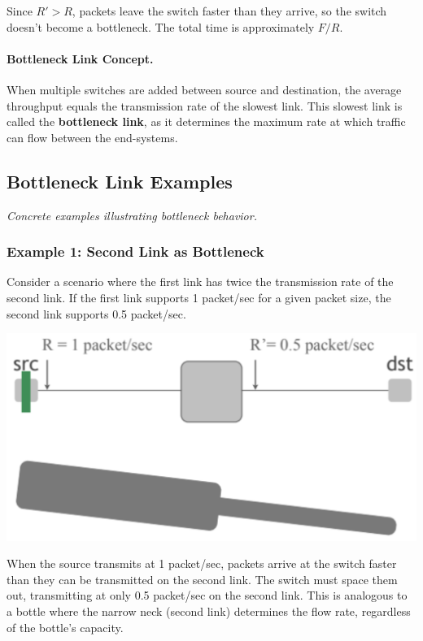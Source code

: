\documentclass[../../compsys.tex]{subfiles}
\begin{document}
Since $R' > R$, packets leave the switch faster than they arrive, so the switch doesn't become a bottleneck. The total time is approximately $F/R$.

\paragraph{Bottleneck Link Concept.} When multiple switches are added between source and destination, the average throughput equals the transmission rate of the slowest link. This slowest link is called the \textbf{bottleneck link}, as it determines the maximum rate at which traffic can flow between the end-systems.

\subsection{Bottleneck Link Examples}
\textit{Concrete examples illustrating bottleneck behavior.}

\subsubsection{Example 1: Second Link as Bottleneck}
Consider a scenario where the first link has twice the transmission rate of the second link. If the first link supports 1 packet/sec for a given packet size, the second link supports 0.5 packet/sec.
\begin{center}
  \includegraphics[width=.55\textwidth]{images/bottleneck_example1.png}
\end{center}
When the source transmits at 1 packet/sec, packets arrive at the switch faster than they can be transmitted on the second link. The switch must space them out, transmitting at only 0.5 packet/sec on the second link. This is analogous to a bottle where the narrow neck (second link) determines the flow rate, regardless of the bottle's capacity.
\end{document}
